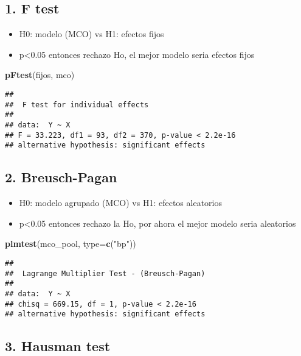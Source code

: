 \documentclass[
]{article}
\newenvironment{Shaded}{\begin{snugshade}}{\end{snugshade}}
\newcommand{\AttributeTok}[1]{\textcolor[rgb]{0.13,0.29,0.53}{#1}}
\newcommand{\FunctionTok}[1]{\textcolor[rgb]{0.13,0.29,0.53}{\textbf{#1}}}
\newcommand{\NormalTok}[1]{#1}
\newcommand{\StringTok}[1]{\textcolor[rgb]{0.31,0.60,0.02}{#1}}
\providecommand{\tightlist}{%
  \setlength{\itemsep}{0pt}\setlength{\parskip}{0pt}}
\begin{document}
\subsection{1. F test}\label{f-test}

\begin{itemize}
\tightlist
\item
  H0: modelo (MCO) vs H1: efectos fijos
\item
  p\textless0.05 entonces rechazo Ho, el mejor modelo seria efectos
  fijos
\end{itemize}

\begin{Shaded}
\begin{Highlighting}[]
\FunctionTok{pFtest}\NormalTok{(fijos, mco) }
\end{Highlighting}
\end{Shaded}

\begin{verbatim}
## 
##  F test for individual effects
## 
## data:  Y ~ X
## F = 33.223, df1 = 93, df2 = 370, p-value < 2.2e-16
## alternative hypothesis: significant effects
\end{verbatim}

\subsection{2. Breusch-Pagan}\label{breusch-pagan}

\begin{itemize}
\tightlist
\item
  H0: modelo agrupado (MCO) vs H1: efectos aleatorios
\item
  p\textless0.05 entonces rechazo la Ho, por ahora el mejor modelo seria
  aleatorios
\end{itemize}

\begin{Shaded}
\begin{Highlighting}[]
\FunctionTok{plmtest}\NormalTok{(mco\_pool, }\AttributeTok{type=}\FunctionTok{c}\NormalTok{(}\StringTok{"bp"}\NormalTok{))}
\end{Highlighting}
\end{Shaded}

\begin{verbatim}
## 
##  Lagrange Multiplier Test - (Breusch-Pagan)
## 
## data:  Y ~ X
## chisq = 669.15, df = 1, p-value < 2.2e-16
## alternative hypothesis: significant effects
\end{verbatim}

\subsection{3. Hausman test}\label{hausman-test}
\end{document}
